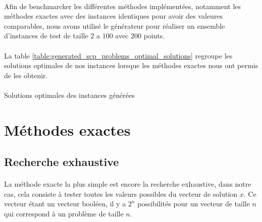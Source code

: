 \documentclass[12pt,letterpaper,twoside]{article}
\begin{document}
			\paragraph*{}
				Afin de benchmarcker les différentes méthodes implémentées, notamment les méthodes exactes avec des instances identiques pour avoir des valeures comparables, nous avons utilisé le générateur pour réaliser un ensemble d'instances de test de taille \(2\) a \(100\) avec \(200\) points.
			\paragraph*{}
				La table \ref{table:generated_scp_problems_optimal_solutions} regroupe les solutions optimales de nos instances lorsque les méthodes exactes nous ont permis de les obtenir.
			\paragraph*{}
			\begin{table}[H]
				\centering
				\begin{minipage}[t]{0.3\linewidth}
					\centering
					
				\end{minipage}
				\begin{minipage}[t]{0.3\linewidth}
					\centering
					
				\end{minipage}
				\begin{minipage}[t]{0.3\linewidth}
					\centering
					
				\end{minipage}
				\caption{Solutions optimales des instances générées}
				\label{table:generated_scp_problems_optimal_solutions}
			\end{table}
	\section{Méthodes exactes}
		\subsection{Recherche exhaustive}
			\paragraph*{}
				La méthode exacte la plus simple est encore la recherche exhaustive, dans notre cas, cela consiste à tester toutes les valeurs possibles du vecteur de solution \(x\). Ce vecteur étant un vecteur booléen, il y a \(2^n\) possibilités pour un vecteur de taille \(n\) qui correspond à un problème de taille \(n\).
\end{document}
